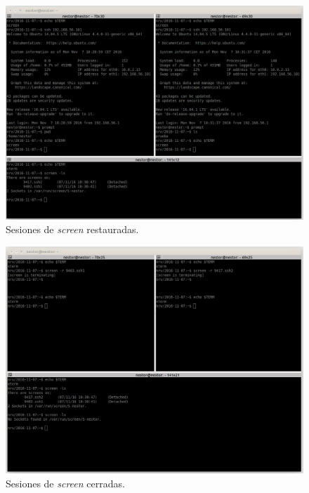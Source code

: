 \documentclass[a4paper,titlepage,12pt]{report}	%
\numberwithin{figure}{section} %
\numberwithin{table}{section} %
\begin{document}
	\begin{figure}[H]
		\centering
		\includegraphics[scale=0.31]{./Imagenes/P2/O1-3.png}
		\caption[Sesiones de \textit{screen} restauradas.]{Sesiones de \textit{screen} restauradas.}
		\label{P2-O1-3}
	\end{figure}

	\begin{figure}[H]
		\centering
		\includegraphics[scale=0.31]{./Imagenes/P2/O1-4.png}
		\caption[Sesiones de \textit{screen} cerradas.]{Sesiones de \textit{screen} cerradas.}
		\label{P2-O1-4}
	\end{figure}

\end{document}
